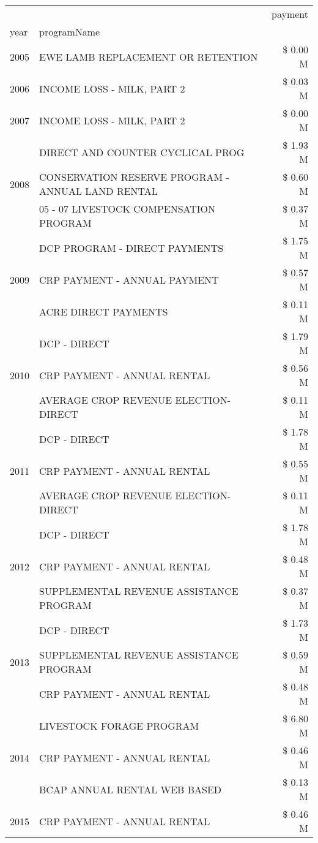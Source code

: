 \begin{tabular}{llr}
\toprule
 &  & payment \\
year & programName &  \\
\midrule
2005 & EWE LAMB REPLACEMENT OR RETENTION & \$ 0.00 M \\
\cline{1-3}
2006 & INCOME LOSS - MILK, PART 2 & \$ 0.03 M \\
\cline{1-3}
2007 & INCOME LOSS - MILK, PART 2 & \$ 0.00 M \\
\cline{1-3}
\multirow[t]{3}{*}{2008} & DIRECT AND COUNTER CYCLICAL PROG & \$ 1.93 M \\
 & CONSERVATION RESERVE PROGRAM - ANNUAL LAND RENTAL & \$ 0.60 M \\
 & 05 - 07 LIVESTOCK COMPENSATION PROGRAM & \$ 0.37 M \\
\cline{1-3}
\multirow[t]{3}{*}{2009} & DCP PROGRAM - DIRECT PAYMENTS & \$ 1.75 M \\
 & CRP PAYMENT - ANNUAL PAYMENT & \$ 0.57 M \\
 & ACRE DIRECT PAYMENTS & \$ 0.11 M \\
\cline{1-3}
\multirow[t]{3}{*}{2010} & DCP - DIRECT & \$ 1.79 M \\
 & CRP PAYMENT - ANNUAL RENTAL & \$ 0.56 M \\
 & AVERAGE CROP REVENUE ELECTION-DIRECT & \$ 0.11 M \\
\cline{1-3}
\multirow[t]{3}{*}{2011} & DCP - DIRECT & \$ 1.78 M \\
 & CRP PAYMENT - ANNUAL RENTAL & \$ 0.55 M \\
 & AVERAGE CROP REVENUE ELECTION-DIRECT & \$ 0.11 M \\
\cline{1-3}
\multirow[t]{3}{*}{2012} & DCP - DIRECT & \$ 1.78 M \\
 & CRP PAYMENT - ANNUAL RENTAL & \$ 0.48 M \\
 & SUPPLEMENTAL REVENUE ASSISTANCE PROGRAM & \$ 0.37 M \\
\cline{1-3}
\multirow[t]{3}{*}{2013} & DCP - DIRECT & \$ 1.73 M \\
 & SUPPLEMENTAL REVENUE ASSISTANCE PROGRAM & \$ 0.59 M \\
 & CRP PAYMENT - ANNUAL RENTAL & \$ 0.48 M \\
\cline{1-3}
\multirow[t]{3}{*}{2014} & LIVESTOCK FORAGE PROGRAM & \$ 6.80 M \\
 & CRP PAYMENT - ANNUAL RENTAL & \$ 0.46 M \\
 & BCAP ANNUAL RENTAL WEB BASED & \$ 0.13 M \\
\cline{1-3}
\multirow[t]{3}{*}{2015} & CRP PAYMENT - ANNUAL RENTAL & \$ 0.46 M \\

\end{tabular}
